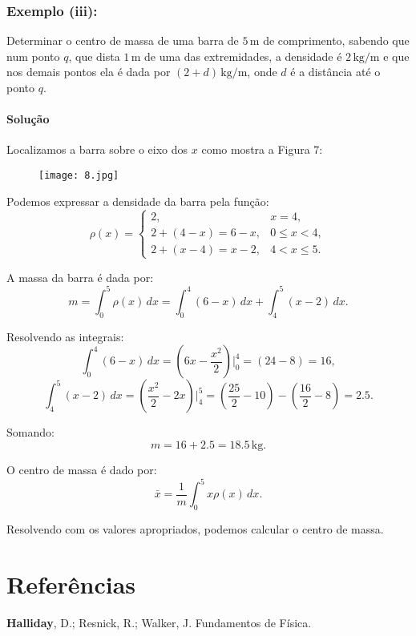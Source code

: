 \documentclass[12pt,a4paper]{report}
\begin{document}
\subsection*{Exemplo (iii):}

Determinar o centro de massa de uma barra de $5 \, \text{m}$ de comprimento, sabendo que num ponto $q$, que dista $1 \, \text{m}$ de uma das extremidades, a densidade é $2 \, \text{kg/m}$ e que nos demais pontos ela é dada por $(2 + d) \, \text{kg/m}$, onde $d$ é a distância até o ponto $q$.

\subsubsection*{Solução}

Localizamos a barra sobre o eixo dos $x$ como mostra a Figura 7:

\begin{figure}[H]
    \centering
    \texttt{[image: 8.jpg]} %
    \caption{}
    \label{fig:ce}
\end{figure}

Podemos expressar a densidade da barra pela função:
\[
\rho(x) =
\begin{cases}
2, & x = 4, \\
2 + (4 - x) = 6 - x, & 0 \leq x < 4, \\
2 + (x - 4) = x - 2, & 4 < x \leq 5.
\end{cases}
\]

A massa da barra é dada por:
\[
m = \int_{0}^{5} \rho(x) \, dx = \int_{0}^{4} (6 - x) \, dx + \int_{4}^{5} (x - 2) \, dx.
\]

Resolvendo as integrais:
\[
\int_{0}^{4} (6 - x) \, dx = \left( 6x - \frac{x^2}{2} \right)\Bigg|_{0}^{4} = (24 - 8) = 16,
\]
\[
\int_{4}^{5} (x - 2) \, dx = \left(\frac{x^2}{2} - 2x\right)\Bigg|_{4}^{5} = \left(\frac{25}{2} - 10\right) - \left(\frac{16}{2} - 8\right) = 2.5.
\]

Somando:
\[
m = 16 + 2.5 = 18.5 \, \text{kg}.
\]

O centro de massa é dado por:
\[
\bar{x} = \frac{1}{m} \int_{0}^{5} x \rho(x) \, dx.
\]

Resolvendo com os valores apropriados, podemos calcular o centro de massa.
\newpage
\chapter*{Referências}

\textbf{Halliday}, D.; Resnick, R.; Walker, J. Fundamentos de Física.
\end{document}

